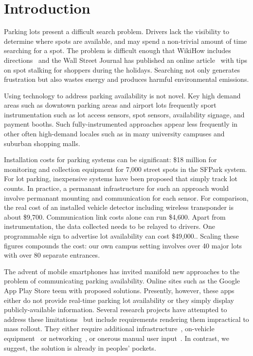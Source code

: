 \section{Introduction}


Parking lots present a difficult search problem. Drivers lack the visibility
to determine where spots are available, and may spend a non-trivial amount of
time searching for a spot. The problem is difficult enough that WikiHow
includes directions~\cite{wikihow-park} and the Wall Street Journal has
published an online article~\cite{wsj-park} with tips on spot stalking for
shoppers during the holidays. Searching not only generates frustration but
also wastes energy and produces harmful environmental emissions.

Using technology to address parking availability is not novel.  Key high
demand areas such as downtown parking areas and airport lots frequently sport
instrumentation such as lot access sensors, spot sensors, availability
signage, and payment booths.  Such fully-instrumented approaches appear less
frequently in other often high-demand locales such as in many university
campuses and suburban shopping malls.

Installation costs for parking systems can be significant:  \$18 million for
monitoring and collection equipment for 7,000 street spots in the SFPark
system.\cite{sfpark}  For lot parking, inexpensive systems have been
proposed that simply track lot counts.\cite{propst2012embedded}  In practice,
a permanant infrastructure for such an approach would involve permanant
mounting and communication for each sensor.  For comparison, the real cost
of an installed vehicle detector including wireless transponder is about
\$9,700.\cite{car-detect}  Communication link costs alone can run
\$4,600.\cite{mstp-park}  Apart from instrumentation, the data collected
needs to be relayed to drivers.  One programmable sign to advertise lot
availability can cost \$49,000.\cite{mstp-park}.  Scaling these figures
compounds the cost:  our own campus setting involves over 40 major lots
with over 80 separate entrances.

The advent of mobile smartphones has invited manifold new approaches to the
problem of communicating parking availability.  Online sites such as the
Google App Play Store teem with proposed solutions.  Presently, however, these
apps either do not provide real-time parking lot availability or they simply
display publicly-available information. Several research projects have
attempted to address these limitations~\cite{4212497, Chen:2012:COS,
Delot:2009:CRP, 5062057, Mathur:2010:PDS} but include requirements rendering
them impractical to mass rollout.  They either require additional
infrastructure~\cite{5062057}, on-vehicle equipment~\cite{Mathur:2010:PDS}
or networking~\cite{Delot:2009:CRP, Mathur:2010:PDS}, or onerous manual user
input~\cite{Chen:2012:COS}. In contrast, we suggest, the solution is already
in peoples' pockets.

